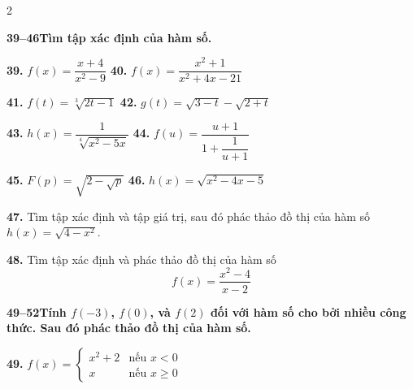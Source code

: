 \fancyhead{}
\enlargethispage{\baselineskip}
\noindent
\begin{multicols}{2}
\fontsize{8pt}{9.8pt}\selectfont
\setlength{\abovedisplayskip}{1pt}
\setlength{\belowdisplayskip}{1pt}

\noindent
\textbf{\color{stewartcyan}39--46}\quad \textbf{Tìm tập xác định của hàm số.}

\vspace{3pt}
\noindent
\textbf{39.} $f(x) = \dfrac{x + 4}{x^2 - 9}$ \hfill \textbf{40.} $f(x) = \dfrac{x^2 + 1}{x^2 + 4x - 21}$

\vspace{2pt}
\noindent
\textbf{41.} $f(t) = \sqrt[3]{2t - 1}$ \hfill \textbf{42.} $g(t) = \sqrt{3 - t} - \sqrt{2 + t}$

\vspace{2pt}
\noindent
\textbf{43.} $h(x) = \dfrac{1}{\sqrt[4]{x^2 - 5x}}$ \hfill \textbf{44.} $f(u) = \dfrac{u + 1}{1 + \dfrac{1}{u + 1}}$

\vspace{2pt}
\noindent
\textbf{45.} $F(p) = \sqrt{2 - \sqrt{p}}$ \hfill \textbf{46.} $h(x) = \sqrt{x^2 - 4x - 5}$

\vspace{3pt}
\noindent{\color{stewartcyan}\rule{\linewidth}{0.6pt}}
\vspace{3pt}

\noindent
\textbf{47.} Tìm tập xác định và tập giá trị, sau đó phác thảo đồ thị của hàm số $h(x) = \sqrt{4 - x^2}$.

\vspace{2pt}
\noindent
\textbf{48.} Tìm tập xác định và phác thảo đồ thị của hàm số
\[
f(x) = \frac{x^2 - 4}{x - 2}
\]

\vspace{3pt}
\noindent{\color{stewartcyan}\rule{\linewidth}{0.6pt}}
\vspace{3pt}

\noindent
\textbf{\color{stewartcyan}49--52}\quad \textbf{Tính $f(-3)$, $f(0)$, và $f(2)$ đối với hàm số cho bởi nhiều công thức. Sau đó phác thảo đồ thị của hàm số.}

\vspace{2pt}
\noindent
\textbf{49.} $f(x) = \begin{cases} x^2 + 2 & \text{nếu } x < 0 \\ x & \text{nếu } x \ge 0 \end{cases}$


\end{multicols}
